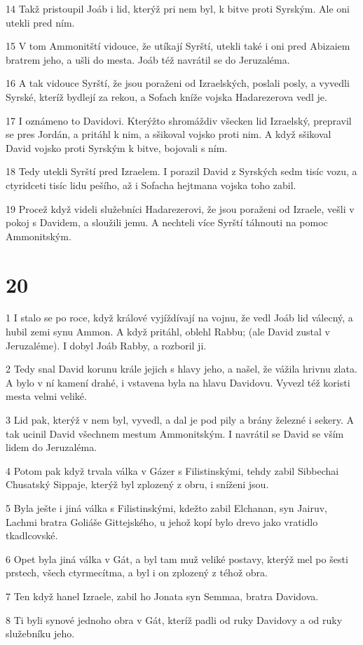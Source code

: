 \par 14 Takž pristoupil Joáb i lid, kterýž pri nem byl, k bitve proti Syrským. Ale oni utekli pred ním.
\par 15 V tom Ammonitští vidouce, že utíkají Syrští, utekli také i oni pred Abizaiem bratrem jeho, a ušli do mesta. Joáb též navrátil se do Jeruzaléma.
\par 16 A tak vidouce Syrští, že jsou poraženi od Izraelských, poslali posly, a vyvedli Syrské, kteríž bydlejí za rekou, a Sofach kníže vojska Hadarezerova vedl je.
\par 17 I oznámeno to Davidovi. Kterýžto shromáždiv všecken lid Izraelský, prepravil se pres Jordán, a pritáhl k nim, a sšikoval vojsko proti nim. A když sšikoval David vojsko proti Syrským k bitve, bojovali s ním.
\par 18 Tedy utekli Syrští pred Izraelem. I porazil David z Syrských sedm tisíc vozu, a ctyridceti tisíc lidu pešího, až i Sofacha hejtmana vojska toho zabil.
\par 19 Procež když videli služebníci Hadarezerovi, že jsou poraženi od Izraele, vešli v pokoj s Davidem, a sloužili jemu. A nechteli více Syrští táhnouti na pomoc Ammonitským.

\chapter{20}

\par 1 I stalo se po roce, když králové vyjíždívají na vojnu, že vedl Joáb lid válecný, a hubil zemi synu Ammon. A když pritáhl, oblehl Rabbu; (ale David zustal v Jeruzaléme). I dobyl Joáb Rabby, a rozboril ji.
\par 2 Tedy snal David korunu krále jejich s hlavy jeho, a našel, že vážila hrivnu zlata. A bylo v ní kamení drahé, i vstavena byla na hlavu Davidovu. Vyvezl též koristi mesta velmi veliké.
\par 3 Lid pak, kterýž v nem byl, vyvedl, a dal je pod pily a brány železné i sekery. A tak ucinil David všechnem mestum Ammonitským. I navrátil se David se vším lidem do Jeruzaléma.
\par 4 Potom pak když trvala válka v Gázer s Filistinskými, tehdy zabil Sibbechai Chusatský Sippaje, kterýž byl zplozený z obru, i sníženi jsou.
\par 5 Byla ješte i jiná válka s Filistinskými, kdežto zabil Elchanan, syn Jairuv, Lachmi bratra Goliáše Gittejského, u jehož kopí bylo drevo jako vratidlo tkadlcovské.
\par 6 Opet byla jiná válka v Gát, a byl tam muž veliké postavy, kterýž mel po šesti prstech, všech ctyrmecítma, a byl i on zplozený z téhož obra.
\par 7 Ten když hanel Izraele, zabil ho Jonata syn Semmaa, bratra Davidova.
\par 8 Ti byli synové jednoho obra v Gát, kteríž padli od ruky Davidovy a od ruky služebníku jeho.

